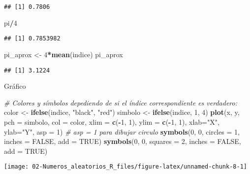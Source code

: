 \documentclass[
]{book}
\newenvironment{Shaded}{\begin{snugshade}}{\end{snugshade}}
\newcommand{\CommentTok}[1]{\textcolor[rgb]{0.56,0.35,0.01}{\textit{#1}}}
\newcommand{\DataTypeTok}[1]{\textcolor[rgb]{0.13,0.29,0.53}{#1}}
\newcommand{\DecValTok}[1]{\textcolor[rgb]{0.00,0.00,0.81}{#1}}
\newcommand{\KeywordTok}[1]{\textcolor[rgb]{0.13,0.29,0.53}{\textbf{#1}}}
\newcommand{\NormalTok}[1]{#1}
\newcommand{\OperatorTok}[1]{\textcolor[rgb]{0.81,0.36,0.00}{\textbf{#1}}}
\newcommand{\OtherTok}[1]{\textcolor[rgb]{0.56,0.35,0.01}{#1}}
\newcommand{\StringTok}[1]{\textcolor[rgb]{0.31,0.60,0.02}{#1}}
\theoremstyle{break}
\theoremstyle{definition}
\theoremstyle{definition}
\theoremstyle{definition}
\theoremstyle{remark}
\begin{document}
\begin{enumerate}
\begin{verbatim}
## [1] 0.7806
\end{verbatim}

\begin{Shaded}
\begin{Highlighting}[]
\NormalTok{pi}\OperatorTok{/}\DecValTok{4}
\end{Highlighting}
\end{Shaded}

\begin{verbatim}
## [1] 0.7853982
\end{verbatim}

\begin{Shaded}
\begin{Highlighting}[]
\NormalTok{pi_aprox <-}\StringTok{ }\DecValTok{4}\OperatorTok{*}\KeywordTok{mean}\NormalTok{(indice)}
\NormalTok{pi_aprox}
\end{Highlighting}
\end{Shaded}

\begin{verbatim}
## [1] 3.1224
\end{verbatim}

  Gráfico

\begin{Shaded}
\begin{Highlighting}[]
\CommentTok{# Colores y símbolos depediendo de si el índice correspondiente es verdadero:}
\NormalTok{color <-}\StringTok{ }\KeywordTok{ifelse}\NormalTok{(indice, }\StringTok{"black"}\NormalTok{, }\StringTok{"red"}\NormalTok{) }
\NormalTok{simbolo <-}\StringTok{ }\KeywordTok{ifelse}\NormalTok{(indice, }\DecValTok{1}\NormalTok{, }\DecValTok{4}\NormalTok{)}
\KeywordTok{plot}\NormalTok{(x, y, }\DataTypeTok{pch =}\NormalTok{ simbolo, }\DataTypeTok{col =}\NormalTok{ color, }
     \DataTypeTok{xlim =} \KeywordTok{c}\NormalTok{(}\OperatorTok{-}\DecValTok{1}\NormalTok{, }\DecValTok{1}\NormalTok{), }\DataTypeTok{ylim =} \KeywordTok{c}\NormalTok{(}\OperatorTok{-}\DecValTok{1}\NormalTok{, }\DecValTok{1}\NormalTok{), }\DataTypeTok{xlab=}\StringTok{"X"}\NormalTok{, }\DataTypeTok{ylab=}\StringTok{"Y"}\NormalTok{, }\DataTypeTok{asp =} \DecValTok{1}\NormalTok{) }
     \CommentTok{# asp = 1 para dibujar circulo}
\KeywordTok{symbols}\NormalTok{(}\DecValTok{0}\NormalTok{, }\DecValTok{0}\NormalTok{, }\DataTypeTok{circles =} \DecValTok{1}\NormalTok{, }\DataTypeTok{inches =} \OtherTok{FALSE}\NormalTok{, }\DataTypeTok{add =} \OtherTok{TRUE}\NormalTok{)}
\KeywordTok{symbols}\NormalTok{(}\DecValTok{0}\NormalTok{, }\DecValTok{0}\NormalTok{, }\DataTypeTok{squares =} \DecValTok{2}\NormalTok{, }\DataTypeTok{inches =} \OtherTok{FALSE}\NormalTok{, }\DataTypeTok{add =} \OtherTok{TRUE}\NormalTok{)}
\end{Highlighting}
\end{Shaded}

  \begin{center}\texttt{[image: 02-Numeros\_aleatorios\_R\_files/figure-latex/unnamed-chunk-8-1]} \end{center}
\end{enumerate}
\end{document}
